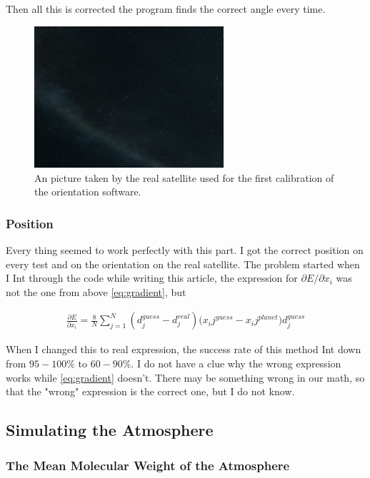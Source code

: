 \documentclass[a4paper, 10pt]{article}
\begin{document}
Then all this is corrected the program finds the correct angle every time.

\begin{figure}[H]
\centering
\includegraphics[width = 70mm]{find_orient.png}
\caption{An picture taken by the real satellite used for the first calibration of the orientation software.}
\end{figure}

\subsubsection{Position}

Every thing seemed to work perfectly with this part. I got the correct position on every test and on the orientation on the real satellite. The problem started when I Int through the code while writing this article, the expression for $\partial E / \partial x_i$ was not the one from above \ref{eq:gradient}, but 

\begin{align}\label{eq:gradient}
\frac{\partial E}{\partial x_i} = \frac{8}{N}\sum_{j=1}^N (d_j^{guess} - d_j^{real}){(x_ij^{guess} - x_ij^{planet}}){d_j^{guess}}
\end{align}

When I changed this to real expression, the success rate of this method Int down from $95-100\%$ to $60-90\%$. I do not have a clue why the wrong expression works while \ref{eq:gradient} doesn't. There may be something wrong in our math, so that the "wrong" expression is the correct one, but I do not know.

\subsection{Simulating the Atmosphere}
\subsubsection{The Mean Molecular Weight of the Atmosphere}
\end{document}
